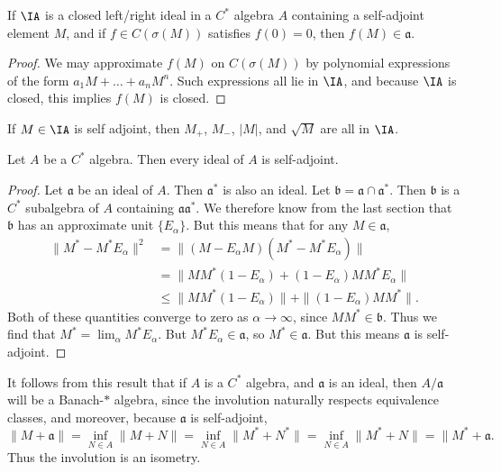 \begin{lemma}
    If $\IA$ is a closed left/right ideal in a $C^*$ algebra $A$ containing a self-adjoint element $M$, and if $f \in C(\sigma(M))$ satisfies $f(0) = 0$, then $f(M) \in \mathfrak{a}$.
\end{lemma}
\begin{proof}
    We may approximate $f(M)$ on $C(\sigma(M))$ by polynomial expressions of the form $a_1 M + \dots + a_n M^n$. Such expressions all lie in $\IA$, and because $\IA$ is closed, this implies $f(M)$ is closed.
\end{proof}

\begin{corollary}
    If $M \in \IA$ is self adjoint, then $M_+$, $M_-$, $|M|$, and $\sqrt{M}$ are all in $\IA$.
\end{corollary}

\begin{lemma}
    Let $A$ be a $C^*$ algebra. Then every ideal of $A$ is self-adjoint.
\end{lemma}
\begin{proof}
    Let $\mathfrak{a}$ be an ideal of $A$. Then $\mathfrak{a}^*$ is also an ideal. Let $\mathfrak{b} = \mathfrak{a} \cap \mathfrak{a}^*$. Then $\mathfrak{b}$ is a $C^*$ subalgebra of $A$ containing $\mathfrak{a} \mathfrak{a}^*$. We therefore know from the last section that $\mathfrak{b}$ has an approximate unit $\{ E_\alpha \}$. But this means that for any $M \in \mathfrak{a}$,
    \begin{align*}
        \| M^* - M^* E_\alpha \|^2 &= \| (M - E_\alpha M) (M^* - M^* E_\alpha) \|\\
        &= \| MM^*(1 - E_\alpha) + (1 - E_\alpha) MM^* E_\alpha \|\\
        &\leq \| MM^* (1 - E_\alpha) \| + \| (1 - E_\alpha) MM^* \|.
    \end{align*}
    Both of these quantities converge to zero as $\alpha \to \infty$, since $MM^* \in \mathfrak{b}$. Thus we find that $M^* = \lim_\alpha M^* E_\alpha$. But $M^* E_\alpha \in \mathfrak{a}$, so $M^* \in \mathfrak{a}$. But this means $\mathfrak{a}$ is self-adjoint.
\end{proof}

It follows from this result that if $A$ is a $C^*$ algebra, and $\mathfrak{a}$ is an ideal, then $A / \mathfrak{a}$ will be a Banach-$*$ algebra, since the involution naturally respects equivalence classes, and moreover, because $\mathfrak{a}$ is self-adjoint,
%
\[ \| M + \mathfrak{a} \| = \inf_{N \in A} \| M + N \| = \inf_{N \in A} \| M^* + N^* \| = \inf_{N \in A} \| M^* + N \| = \| M^* + \mathfrak{a}. \]
%
Thus the involution is an isometry.

